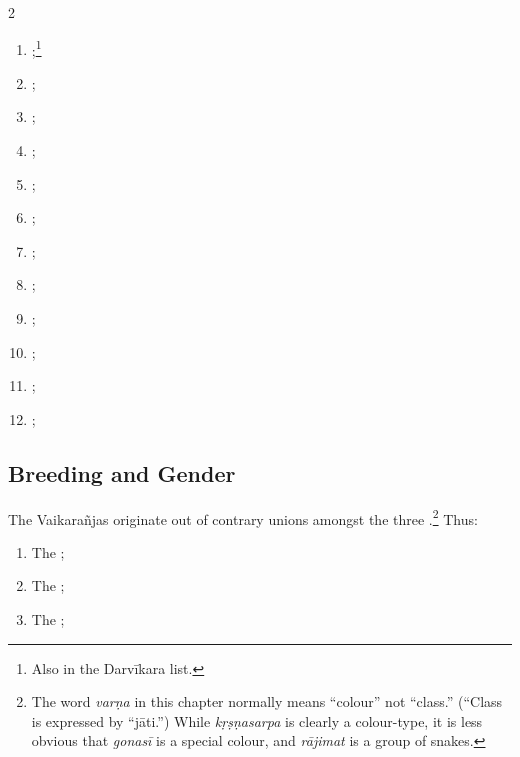 \begin{translation}
\begin{multicols}{2}
    \begin{enumerate}
        \raggedright
\item {};\footnote{Also in the Darvīkara 
    list.}  
    \item {}; 
    \item {};
    \item {}; 
    \item {}; 
    \item {}; 
    \item {};
    \item {}; 
    \item {}; 
    \item {}; 
    \item {}; 
    \item {};
    \end{enumerate}
\end{multicols}

\medskip

\subsection{Breeding and Gender}
\item[34.5]

The Vaikarañjas originate out of contrary unions amongst the three 
.\footnote{The word 
\emph{varṇa} in this chapter normally means “colour” not “class.”  (“Class is 
expressed by “jāti.”)  While \emph{kṛṣṇasarpa} is clearly a colour-type, it is less 
obvious that \emph{gonasī} is a special colour, and \emph{rājimat} is a group of 
snakes.}
    Thus:

    \begin{enumerate}
        \raggedright
\item The ; 
\item The ; 
\item The ; 
\end{enumerate}


\end{translation}
